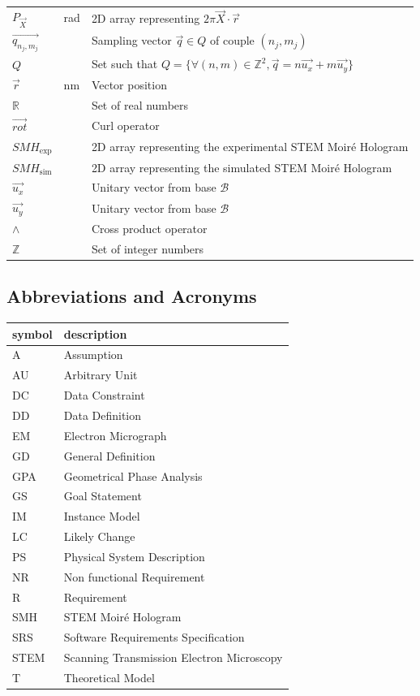 \documentclass[12pt]{article}
\begin{document}
\begin{longtable*}{l l p{12cm}}
$P_{\overrightarrow{X}}$ & rad & 2D array representing $2\pi\overrightarrow{X}\cdot\vec{r}$\\
$\overrightarrow{q_{n_j,m_j}}$ & & Sampling vector $\vec{q} \in Q$ of couple $(n_j,m_j)$\\
$Q$ & & Set such that $Q=\{\forall (n,m) \in \mathbb{Z}^{2}, \vec{q}=n\vec{u_x}+m\vec{u_y}\}$ \\
$\vec{r}$ & \si{\nano\meter} & Vector position \\
$\mathbb{R}$ & & Set of real numbers \\
$\overrightarrow{\mathit{rot}}$ & & Curl operator\\
$\mathit{SMH}_{\text{exp}}$ & & 2D array representing the experimental STEM Moir{\'e} Hologram \\
$\mathit{SMH}_{\text{sim}}$ & & 2D array representing the simulated STEM Moir{\'e} Hologram \\
$\vec{u_x}$ & & Unitary vector from base $\mathcal{B}$ \\
$\vec{u_y}$ & & Unitary vector from base $\mathcal{B}$ \\
$\wedge$ & & Cross product operator\\
$\mathbb{Z}$ & & Set of integer numbers\\
\bottomrule
\end{longtable*}

\subsection{Abbreviations and Acronyms}

\renewcommand{\arraystretch}{1.2}
\begin{tabular}{l l} 
  \toprule		
  \textbf{symbol} & \textbf{description}\\
  \midrule 
  A & Assumption\\
  AU & Arbitrary Unit\\
  DC & Data Constraint \\
  DD & Data Definition\\
  EM & Electron Micrograph \\
  GD & General Definition\\
  GPA & Geometrical Phase Analysis \\
  GS & Goal Statement\\
  IM & Instance Model\\
  LC & Likely Change\\
  PS & Physical System Description\\
  NR & Non functional Requirement\\
  R & Requirement\\
  SMH & STEM Moir{\'e} Hologram \\
  SRS & Software Requirements Specification\\
  STEM & Scanning Transmission Electron Microscopy \\
  T & Theoretical Model\\
  \bottomrule
\end{tabular}
\end{document}
